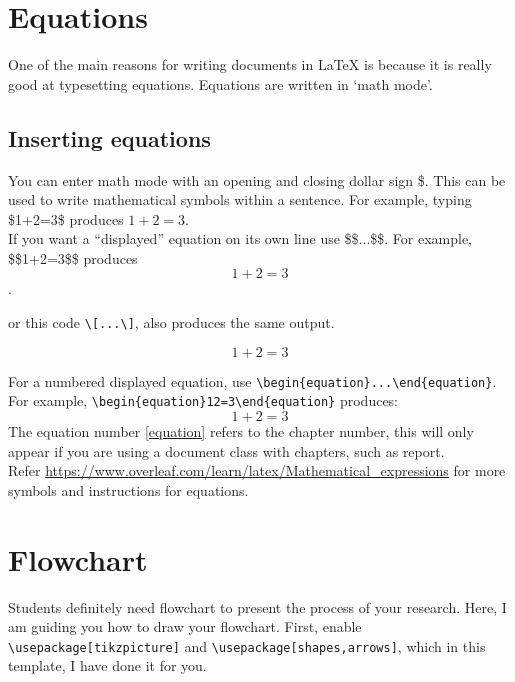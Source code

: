 \section{Equations}
One of the main reasons for writing documents in {\LaTeX} is because it is really good at typesetting equations. Equations are written in ‘math mode’.

\subsection{Inserting equations}
You can enter math mode with an opening and closing dollar sign \$. This can be used to write mathematical symbols within a sentence. For example, typing \$1+2=3\$ produces $1 + 2 = 3$.\\

If you want a “displayed” equation on its own line use \$\$...\$\$. For example, \$\$1+2=3\$\$ produces $$1+2=3$$.

\noindent or this code \verb+\[...\]+, also produces the same output.

\[ 1+2=3 \]

For a numbered displayed equation, use \verb+\begin{equation}...\end{equation}+.
For example, \verb+\begin{equation}1+\verb+2=3\end{equation}+ produces: 
\begin{equation}
\label{equation}
1+2=3
\end{equation}
The equation number \ref{equation} refers to the chapter number, this will only appear if you are using a document class with chapters, such as report.\\

Refer \url{https://www.overleaf.com/learn/latex/Mathematical_expressions} for more symbols and instructions for equations.



 \section{Flowchart}
 
Students definitely need flowchart to present the process of your research. Here, I am guiding you how to draw your flowchart. First, enable \verb+\usepackage[tikzpicture]+ and \verb+\usepackage[shapes,arrows]+, which in this template, I have done it for you.\\

